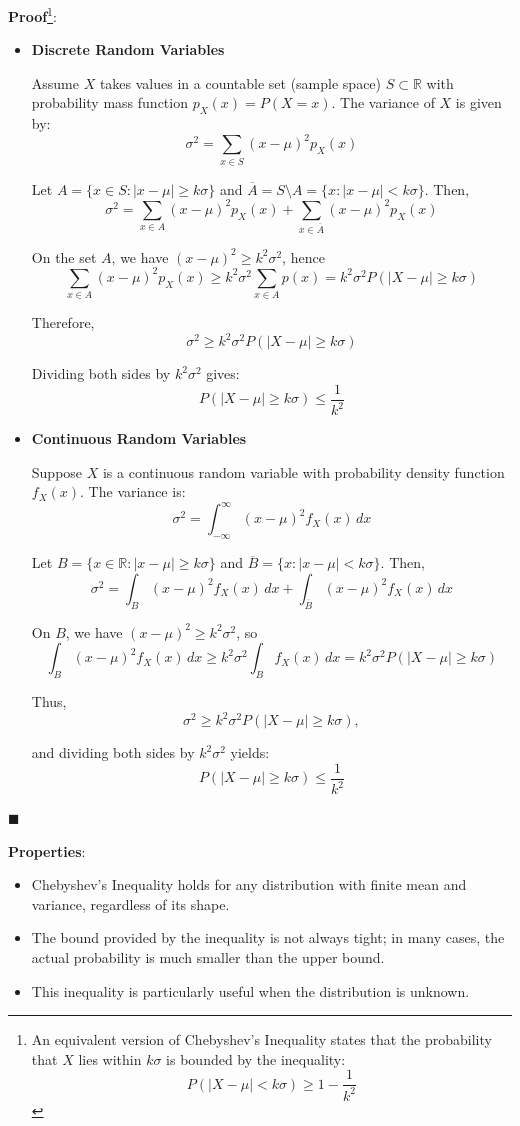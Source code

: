 \documentclass[twoside]{book}
\begin{document}
\textbf{Proof}\footnote{An equivalent version of Chebyshev's Inequality states that the probability that $X$ lies within $k\sigma$ is bounded by the inequality:
\[
P(|X - \mu| < k\sigma) \geq 1 - \frac{1}{k^2}
\]}:
\begin{itemize}
    \item \textbf{Discrete Random Variables}

Assume $X$ takes values in a countable set (sample space) $S \subset \mathbb{R}$ with probability mass function $p_X(x) = P(X = x)$. The variance of $X$ is given by:
\[
\sigma^2 = \sum_{x \in S} (x - \mu)^2 p_X(x)
\]

Let $A = \{x \in S : |x - \mu| \geq k\sigma \}$ and $\overline{A} = S \setminus A = \{x : |x - \mu| < k\sigma \}$. Then,
\[
\sigma^2 = \sum_{x \in A} (x - \mu)^2 p_X(x) + \sum_{x \in \overline{A}} (x - \mu)^2 p_X(x)
\]

On the set $A$, we have $(x - \mu)^2 \geq k^2 \sigma^2$, hence
\[
\sum_{x \in A} (x - \mu)^2 p_X(x) \geq k^2 \sigma^2 \sum_{x \in A} p(x) = k^2 \sigma^2 P(|X - \mu| \geq k\sigma)
\]

Therefore,
\[
\sigma^2 \geq k^2 \sigma^2 P(|X - \mu| \geq k\sigma)
\]

Dividing both sides by $k^2 \sigma^2$ gives:
\[
P(|X - \mu| \geq k\sigma) \leq \frac{1}{k^2}
\]

\item \textbf{Continuous Random Variables}

Suppose $X$ is a continuous random variable with probability density function $f_X(x)$. The variance is:
\[
\sigma^2 = \int_{-\infty}^{\infty} (x - \mu)^2 f_X(x) \, dx
\]

Let $B = \{x \in \mathbb{R} : |x - \mu| \geq k\sigma \}$ and $\overline{B}= \{x : |x - \mu| < k\sigma \}$. Then,
\[
\sigma^2 = \int_{B} (x - \mu)^2 f_X(x) \, dx + \int_{\overline{B}} (x - \mu)^2 f_X(x) \, dx
\]

On $B$, we have $(x - \mu)^2 \geq k^2 \sigma^2$, so
\[
\int_{B} (x - \mu)^2 f_X(x) \, dx \geq k^2 \sigma^2 \int_{B} f_X(x) \, dx = k^2 \sigma^2 P(|X - \mu| \geq k\sigma)
\]

Thus,
\[
\sigma^2 \geq k^2 \sigma^2 P(|X - \mu| \geq k\sigma),
\]

and dividing both sides by $k^2 \sigma^2$ yields:
\[
P(|X - \mu| \geq k\sigma) \leq \frac{1}{k^2}
\]
\end{itemize}
\hfill\(\blacksquare\)


\textbf{Properties}:

\begin{itemize}
    \item Chebyshev's Inequality holds for any distribution with finite mean and variance, regardless of its shape.
    \item The bound provided by the inequality is not always tight; in many cases, the actual probability is much smaller than the upper bound.
    \item This inequality is particularly useful when the distribution is unknown.
\end{itemize}
\end{document}
